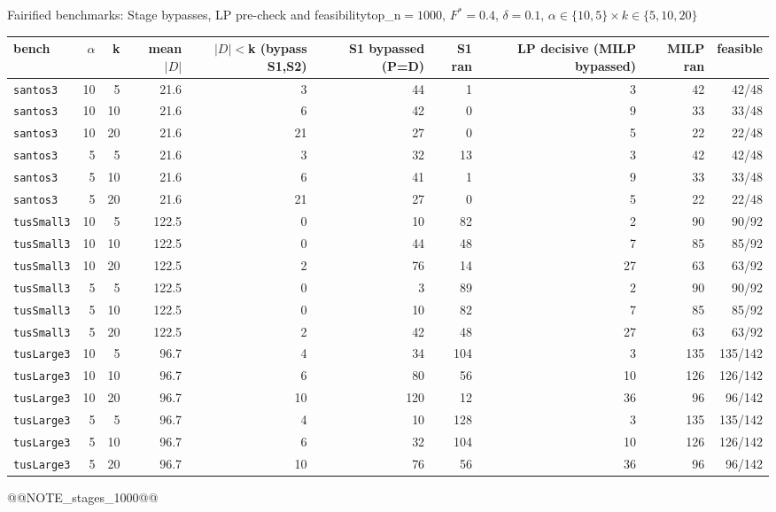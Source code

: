 \begin{frame}{Fairified benchmarks: Stage bypasses, LP pre-check and feasibility}{top\_n$=1000$, $F^*{=}0.4$, $\delta{=}0.1$, $\alpha\in\{10,5\}\times k\in\{5,10,20\}$}
\tiny
\begin{center}
\setlength{\tabcolsep}{2.5pt}
\begin{tabular}{lrrrrrrrrr}
\toprule
bench & $\alpha$ & k & mean $|D|$ & $|D|$$<$k (bypass S1,S2) & S1 bypassed (P=D) & S1 ran & LP decisive (MILP bypassed) & MILP ran & feasible \\
\midrule
\texttt{santos3} & 10 & 5 & 21.6 & 3 & 44 & 1 & 3 & 42 & 42/48 \\
\texttt{santos3} & 10 & 10 & 21.6 & 6 & 42 & 0 & 9 & 33 & 33/48 \\
\texttt{santos3} & 10 & 20 & 21.6 & 21 & 27 & 0 & 5 & 22 & 22/48 \\
\texttt{santos3} & 5 & 5 & 21.6 & 3 & 32 & 13 & 3 & 42 & 42/48 \\
\texttt{santos3} & 5 & 10 & 21.6 & 6 & 41 & 1 & 9 & 33 & 33/48 \\
\texttt{santos3} & 5 & 20 & 21.6 & 21 & 27 & 0 & 5 & 22 & 22/48 \\
\texttt{tusSmall3} & 10 & 5 & 122.5 & 0 & 10 & 82 & 2 & 90 & 90/92 \\
\texttt{tusSmall3} & 10 & 10 & 122.5 & 0 & 44 & 48 & 7 & 85 & 85/92 \\
\texttt{tusSmall3} & 10 & 20 & 122.5 & 2 & 76 & 14 & 27 & 63 & 63/92 \\
\texttt{tusSmall3} & 5 & 5 & 122.5 & 0 & 3 & 89 & 2 & 90 & 90/92 \\
\texttt{tusSmall3} & 5 & 10 & 122.5 & 0 & 10 & 82 & 7 & 85 & 85/92 \\
\texttt{tusSmall3} & 5 & 20 & 122.5 & 2 & 42 & 48 & 27 & 63 & 63/92 \\
\texttt{tusLarge3} & 10 & 5 & 96.7 & 4 & 34 & 104 & 3 & 135 & 135/142 \\
\texttt{tusLarge3} & 10 & 10 & 96.7 & 6 & 80 & 56 & 10 & 126 & 126/142 \\
\texttt{tusLarge3} & 10 & 20 & 96.7 & 10 & 120 & 12 & 36 & 96 & 96/142 \\
\texttt{tusLarge3} & 5 & 5 & 96.7 & 4 & 10 & 128 & 3 & 135 & 135/142 \\
\texttt{tusLarge3} & 5 & 10 & 96.7 & 6 & 32 & 104 & 10 & 126 & 126/142 \\
\texttt{tusLarge3} & 5 & 20 & 96.7 & 10 & 76 & 56 & 36 & 96 & 96/142 \\
\bottomrule
\end{tabular}
\end{center}
@@NOTE_stages_1000@@
\end{frame}

